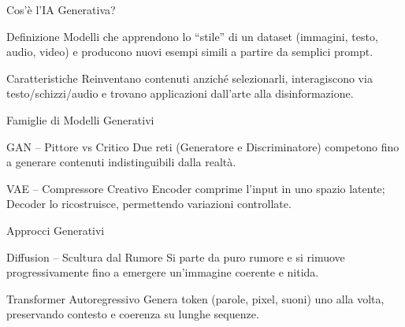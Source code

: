 \documentclass[12pt]{beamer}
\begin{document}
\begin{frame}{Cos’è l’IA Generativa?}
  \begin{alertblock}{Definizione}
    Modelli che apprendono lo “stile” di un dataset (immagini, testo, audio, video) e producono nuovi esempi simili a partire da semplici prompt.
  \end{alertblock}
  \begin{alertblock}{Caratteristiche}
    Reinventano contenuti anziché selezionarli, interagiscono via testo/schizzi/audio e trovano applicazioni dall’arte alla disinformazione.
  \end{alertblock}
\end{frame}

\begin{frame}{Famiglie di Modelli Generativi}
  \begin{alertblock}{GAN – Pittore vs Critico}
    Due reti (Generatore e Discriminatore) competono fino a generare contenuti indistinguibili dalla realtà.
  \end{alertblock}
  \begin{alertblock}{VAE – Compressore Creativo}
    Encoder comprime l’input in uno spazio latente; Decoder lo ricostruisce, permettendo variazioni controllate.
  \end{alertblock}
\end{frame}

\begin{frame}{Approcci Generativi}
  \begin{alertblock}{Diffusion – Scultura dal Rumore}
    Si parte da puro rumore e si rimuove progressivamente fino a emergere un’immagine coerente e nitida.
  \end{alertblock}
  \begin{alertblock}{Transformer Autoregressivo}
    Genera token (parole, pixel, suoni) uno alla volta, preservando contesto e coerenza su lunghe sequenze.
  \end{alertblock}
\end{frame}
\end{document}
